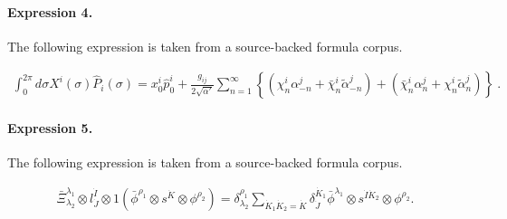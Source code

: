 \documentclass[11pt]{article}
\begin{document}
\paragraph{Expression 4.} The following expression is taken from a source-backed formula corpus.

\begin{align*}\int^{2\pi}_{0} d\sigma X^{i}(\sigma)\hat{P}_{i}(\sigma) =x^{i}_{0}\hat{p}^{i}_{0} +\frac{g_{ij}}{2\sqrt{\alpha'}} \sum_{n=1}^{\infty}\left\{ \left( \chi_{n}^{i}\alpha^{j}_{-n} +\bar{\chi}^{i}_{n}\tilde{\alpha}^{j}_{-n} \right) +\left(\bar{\chi}_{n}^{i}\alpha^{j}_{n} +\chi_{n}^{i} \tilde{\alpha}^{j}_{n}\right) \right\}~.\end{align*}

\paragraph{Expression 5.} The following expression is taken from a source-backed formula corpus.

\begin{align*}\bar{\Xi}^{\lambda_1}_{\lambda_2} \otimes l^{\dot{I}}_{\dot{J}} \otimes 1 \left( \bar{\phi}^{\rho_1} \otimes s^{\dot{K}} \otimes \phi^{\rho_2} \right) = \delta^{\rho_1}_{\lambda_2} \sum_{\dot{K}_1\dot{K}_2 = \dot{K}} \delta^{\dot{K}_1}_{\dot{J}} \bar{\phi}^{\lambda_1} \otimes s^{\dot{I} \dot{K}_2} \otimes \phi^{\rho_2}. \end{align*}
\end{document}
